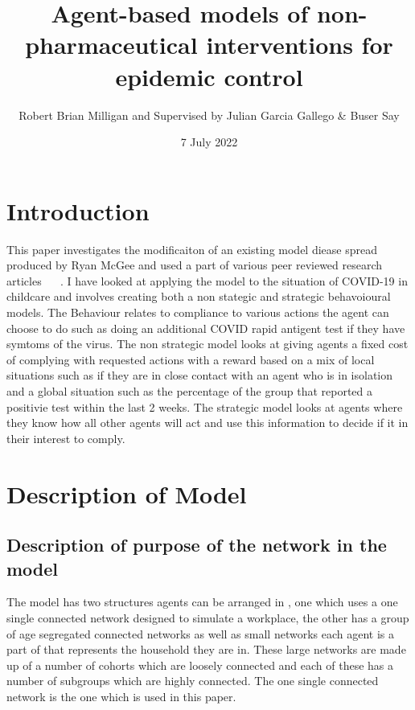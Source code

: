 \documentclass{article}
\title{Agent-based models of non-pharmaceutical interventions for epidemic control}
\author{Robert Brian Milligan and Supervised by Julian Garcia Gallego \& Buser Say}
\date{7 July 2022}
\begin{document}
\maketitle


\tableofcontents

\newpage 

\section{Introduction}
This paper investigates the modificaiton of an existing model diease spread produced by Ryan McGee and used a part of various peer reviewed research articles ~\cite{mcgee_homburger_williams_bergstrom_zhou_2021} ~\cite{mcgee_homburger_williams_bergstrom_zhou_2021_2}. I have looked at applying the model to the situation of COVID-19 in childcare and involves creating both a non stategic and strategic behavoioural models. The Behaviour relates to compliance to various actions the agent can choose to do such as doing an additional COVID rapid antigent test if they have symtoms of the virus. The non strategic model looks at giving agents a fixed cost of complying with requested actions with a reward based on a mix of local situations such as if they are in close contact with an agent who is in isolation and a global situation such as the percentage of the group that reported a positivie test within the last 2 weeks. The strategic model looks at agents where they know how all other agents will act and use this information to decide if it in their interest to comply.

\section{Description of Model}
\subsection{Description of purpose of the network in the model}
The model has two structures agents can be arranged in , one which uses a one single connected network designed to simulate a workplace, the other has a group of age segregated connected networks as well as small networks each agent is a part of that represents the household they are in. These large networks are made up of a number of cohorts which are loosely connected and each of these has a number of subgroups which are highly connected. The one single connected network is the one which is used in this paper.
\end{document}

